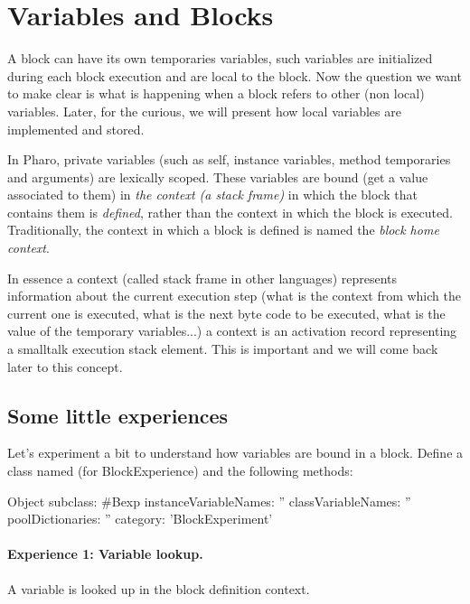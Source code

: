 \documentclass[a4paper,10pt,twoside]{book}
\begin{document}
\section{Variables and Blocks}
A block can have its own temporaries variables, such variables are initialized during each block execution and are local to the block. Now the question we want to make clear is what is happening when a block refers to other (non local) variables. Later, for the curious, we will present how local variables are implemented and stored.

In Pharo, private variables (such as self, instance variables, method temporaries and arguments) are lexically scoped. These variables are bound (get a value associated to them) in \emph{the context (a stack frame)} in which the block that contains them is \emph{defined}, rather than the context in which the block is executed.  Traditionally, the context in which a block is defined is named the \emph{block home context}.

In essence a context (called stack frame in other languages) represents information about the current execution step (what is the context from which the current one is executed, what is the next byte code to be executed, what is the value of the temporary variables...) a context is an activation record representing a smalltalk execution stack element. This is important and we will come back later to this concept.

\subsection{Some little experiences}
Let's experiment a bit to understand how variables are bound in a block. Define a class named  (for BlockExperience) and the following methods:

\begin{code}{}
Object subclass: #Bexp
	instanceVariableNames: ''
	classVariableNames: ''
	poolDictionaries: ''
	category: 'BlockExperiment'
\end{code}

\paragraph{Experience 1: Variable lookup.} A variable is looked up in the block definition context.
\end{document}
